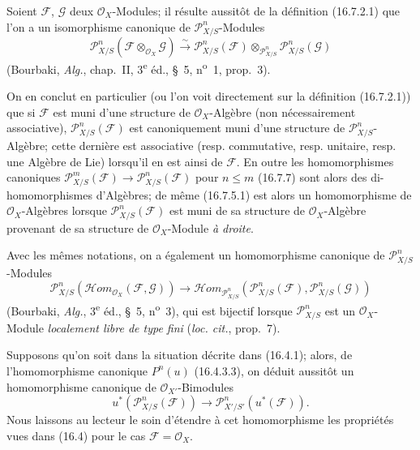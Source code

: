 
\begin{env}[16.7.8]
\label{IV.16.7.8}
Soient $\mathscr{F}$, $\mathscr{G}$ deux $\mathcal{O}_X$-Modules; il résulte
aussitôt de la définition (16.7.2.1) que l'on a un isomorphisme canonique de
$\mathscr{P}_{X/S}^n$-Modules
\[
  \mathscr{P}_{X/S}^n(\mathscr{F}\otimes_{\mathcal{O}_X}\mathscr{G})
  \xrightarrow{\sim}
  \mathscr{P}_{X/S}^n(\mathscr{F})
  \otimes_{\mathscr{P}_{X/S}^n}\mathscr{P}_{X/S}^n(\mathscr{G})
  \tag{16.7.8.1}
  \label{IV.16.7.8.1}
\]
(Bourbaki, \emph{Alg.}, chap.~II, 3\textsuperscript{e} éd., §~5,
n\textsuperscript{o}~1, prop.~3).

On en conclut en particulier (ou l'on voit directement sur la définition
(16.7.2.1)) que si $\mathscr{F}$ est muni d'une structure de
$\mathcal{O}_X$-Algèbre (non nécessairement associative),
$\mathscr{P}_{X/S}^n(\mathscr{F})$ est canoniquement muni d'une structure de
$\mathscr{P}_{X/S}^n$-Algèbre; cette dernière est associative (resp.
commutative, resp. unitaire, resp. une Algèbre de Lie) lorsqu'il en est ainsi
de $\mathscr{F}$. En outre les homomorphismes canoniques
$\mathscr{P}_{X/S}^m(\mathscr{F})\to\mathscr{P}_{X/S}^n(\mathscr{F})$ pour
$n\leq m$ (16.7.7) sont alors des di-homomorphismes d'Algèbres; de même
(16.7.5.1) est alors un homomorphisme de $\mathcal{O}_X$-Algèbres lorsque
$\mathscr{P}_{X/S}^n(\mathscr{F})$ est muni de sa structure de
$\mathcal{O}_X$-Algèbre provenant de sa structure de $\mathcal{O}_X$-Module
\emph{à droite}.

Avec les mêmes notations, on a également un homomorphisme canonique de
$\mathscr{P}_{X/S}^n$-Modules
\[
  \mathscr{P}_{X/S}^n
  (\mathscr{H}\!om_{\mathcal{O}_X}(\mathscr{F},\mathscr{G}))
  \longrightarrow
  \mathscr{H}\!om_{\mathscr{P}_{X/S}^n}
  (\mathscr{P}_{X/S}^n(\mathscr{F}),\mathscr{P}_{X/S}^n(\mathscr{G}))
  \tag{16.7.8.2}
  \label{IV.16.7.8.2}
\]
(Bourbaki, \emph{Alg.}, 3\textsuperscript{e} éd., §~5,
n\textsuperscript{o}~3), qui est bijectif lorsque $\mathscr{P}_{X/S}^n$ est
un $\mathcal{O}_X$-Module \emph{localement libre de type fini}
(\emph{loc. cit.}, prop.~7).
\end{env}

\begin{env}[16.7.9]
\label{IV.16.7.9}
Supposons qu'on soit dans la situation décrite dans (16.4.1); alors, de
l'homomorphisme canonique $P^n(u)$ (16.4.3.3), on déduit aussitôt un
homomorphisme canonique de $\mathcal{O}_{X'}$-Bimodules
\[
  u^*(\mathscr{P}_{X/S}^n(\mathscr{F}))
  \longrightarrow
  \mathscr{P}_{X'/S'}^n(u^*(\mathscr{F})).
  \tag{16.7.9.1}
  \label{IV.16.7.9.1}
\]
Nous laissons au lecteur le soin d'étendre à cet homomorphisme les propriétés
vues dans (16.4) pour le cas $\mathscr{F}=\mathcal{O}_X$.
\end{env}

